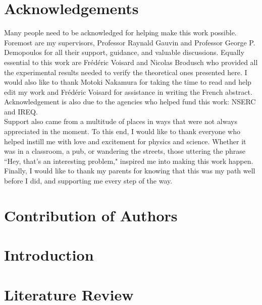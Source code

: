 \documentclass[12pt]{report}
\begin{document}
\chapter*{Acknowledgements}
Many people need to be acknowledged for helping make this work possible.  Foremost are my supervisors,  Professor Raynald Gauvin and  Professor George P. Demopoulos for all their support, guidance, and valuable discussions.  Equally essential to this work are Fr\'ed\'eric Voisard and Nicolas Brodusch who provided all the experimental results needed to verify the theoretical ones presented here. I would also like to thank Motoki Nakamura  for taking the time to read and help edit my work and Fr\'ed\'eric Voisard for assistance in writing the French abstract. Acknowledgement is also due to the agencies who helped fund this work: NSERC and IREQ.  \\

Support also came from a multitude of places in ways that were not always appreciated in the moment.  To this end, I would like to thank everyone who helped instill me with love and excitement for physics and science.  Whether it was in a classroom, a pub, or wandering the streets, those uttering the phrase ``Hey, that's an interesting problem," inspired me into making this work happen. Finally, I would like to thank my parents for knowing that this was my path well before I did, and supporting me every step of the way. 




\chapter*{Contribution of Authors}











\chapter{Introduction}
\renewcommand{\thepage}{\arabic{page}}%
\setcounter{page}{1}%




\chapter{Literature Review}\label{literature_review}

\end{document}
